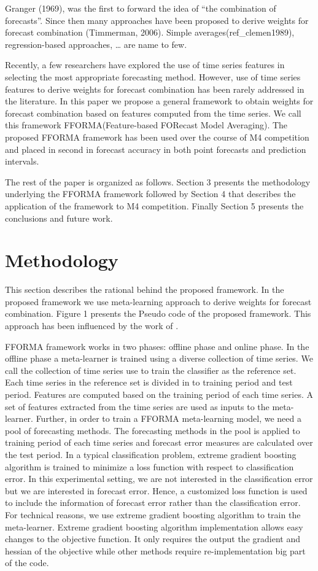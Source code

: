 \documentclass[11pt,a4paper,]{article}
\theoremstyle{definition}
\theoremstyle{definition}
\theoremstyle{definition}
\theoremstyle{remark}
\begin{document}
Granger (1969), was the first to forward the idea of ``the combination
of forecasts''. Since then many approaches have been proposed to derive
weights for forecast combination (Timmerman, 2006). Simple
averages(ref\_clemen1989), regression-based approaches, \ldots{} are
name to few.

Recently, a few researchers have explored the use of time series
features in selecting the most appropriate forecasting method. However,
use of time series features to derive weights for forecast combination
has been rarely addressed in the literature. In this paper we propose a
general framework to obtain weights for forecast combination based on
features computed from the time series. We call this framework
FFORMA(Feature-based FORecast Model Averaging). The proposed FFORMA
framework has been used over the course of M4 competition and placed in
second in forecast accuracy in both point forecasts and prediction
intervals.

The rest of the paper is organized as follows. Section 3 presents the
methodology underlying the FFORMA framework followed by Section 4 that
describes the application of the framework to M4 competition. Finally
Section 5 presents the conclusions and future work.

\section{Methodology}\label{methodology}

This section describes the rational behind the proposed framework. In
the proposed framework we use meta-learning approach to derive weights
for forecast combination. Figure 1 presents the Pseudo code of the
proposed framework. This approach has been influenced by the work of
\textcite{fforms}.

FFORMA framework works in two phases: offline phase and online phase. In
the offline phase a meta-learner is trained using a diverse collection
of time series. We call the collection of time series use to train the
classifier as the reference set. Each time series in the reference set
is divided in to training period and test period. Features are computed
based on the training period of each time series. A set of features
extracted from the time series are used as inputs to the meta-learner.
Further, in order to train a FFORMA meta-learning model, we need a pool
of forecasting methods. The forecasting methods in the pool is applied
to training period of each time series and forecast error measures are
calculated over the test period. In a typical classification problem,
extreme gradient boosting algorithm is trained to minimize a loss
function with respect to classification error. In this experimental
setting, we are not interested in the classification error but we are
interested in forecast error. Hence, a customized loss function is used
to include the information of forecast error rather than the
classification error. For technical reasons, we use extreme gradient
boosting algorithm to train the meta-learner. Extreme gradient boosting
algorithm implementation allows easy changes to the objective function.
It only requires the output the gradient and hessian of the objective
while other methods require re-implementation big part of the code.
\end{document}
